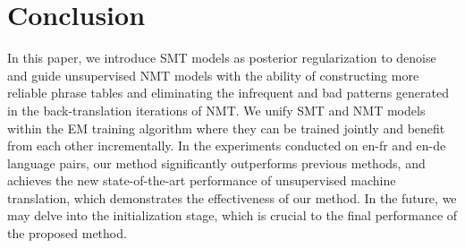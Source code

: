\documentclass[letterpaper]{article} \usepackage{aaai19}  \usepackage{times}  \usepackage{helvet}  \usepackage{courier}  \usepackage{url}  \usepackage{graphicx}  \usepackage{amsmath}
\begin{document}
\section{Conclusion}
In this paper, we introduce SMT models as posterior regularization to denoise and guide unsupervised NMT models with the ability of constructing more reliable phrase tables and eliminating the infrequent and bad patterns generated in the back-translation iterations of NMT. We unify SMT and NMT models within the EM training algorithm where they can be trained jointly and benefit from each other incrementally. In the experiments conducted on en-fr and en-de language pairs, our method significantly outperforms previous methods, and achieves the new state-of-the-art performance of unsupervised machine translation, which demonstrates the effectiveness of our method. In the future, we may delve into the initialization stage, which is crucial to the final performance of the proposed method.



\end{document}
